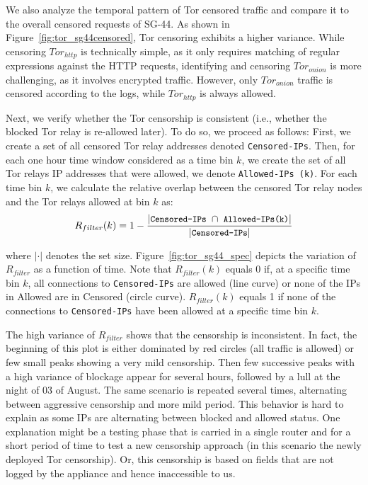 \documentclass{sig-alternate-2013}
\begin{document}
We also analyze the temporal pattern of Tor censored traffic and compare it to the overall censored requests of SG-44. As shown in 
Figure~\ref{fig:tor_sg44censored}, Tor censoring exhibits a higher variance.
While censoring $Tor_{http}$ is technically simple, as it only requires matching of regular expressions against the HTTP requests, identifying and censoring $Tor_{onion}$ is more challenging, as it involves encrypted traffic. However, only $Tor_{onion}$ traffic is censored according to the logs, while $Tor_{http}$ is always allowed.



Next, we verify whether the Tor censorship is consistent (i.e., whether the blocked Tor relay is re-allowed later). To do so, we proceed as follows: 
First, we create a set of all censored Tor relay addresses denoted \texttt{Censored-IPs}.  
Then, for each one hour time window considered as a time bin $k$, we create the set of all Tor relays IP addresses that were allowed, we denote \texttt{Allowed-IPs (k)}. For each time bin $k$, we calculate the relative overlap between the censored Tor relay nodes and the Tor relays allowed at bin $k$ as: 
\[\small R_{filter}(k)= 1 - \frac{|\texttt{Censored-IPs}~ \cap ~\texttt{Allowed-IPs(k)} |}{|\texttt{Censored-IPs}|} \vspace{-0.1cm}\]

\noindent where $|\cdot|$ denotes the set size. Figure~\ref{fig:tor_sg44_spec} depicts the variation of $R_{filter}$ as a function of time. Note that $R_{filter}(k)$ equals 0 if, at a specific time bin $k$, all connections to \texttt{Censored-IPs} are allowed (line curve) or none of the IPs in Allowed are in Censored (circle curve). $R_{filter}(k)$ equals 1 if none of the connections to  \texttt{Censored-IPs} have been allowed at a specific time bin $k$. 

The high variance of $R_{filter}$ shows that the censorship is inconsistent. In fact, the beginning of this plot is either dominated by red circles (all traffic is allowed) or few small peaks showing a very mild censorship. Then few successive peaks with a high variance of blockage appear for several hours, followed by a lull at the night of 03 of August. The same scenario is repeated several times, alternating between aggressive censorship and more mild period. This behavior  is hard to explain as some IPs are alternating between blocked and allowed status. One explanation might be a testing phase that is carried in a single router and for a short period of time to test a new censorship approach (in this scenario the newly deployed Tor censorship).  Or, this censorship is based on fields that are not logged by the appliance and hence inaccessible to us.  
\end{document}
